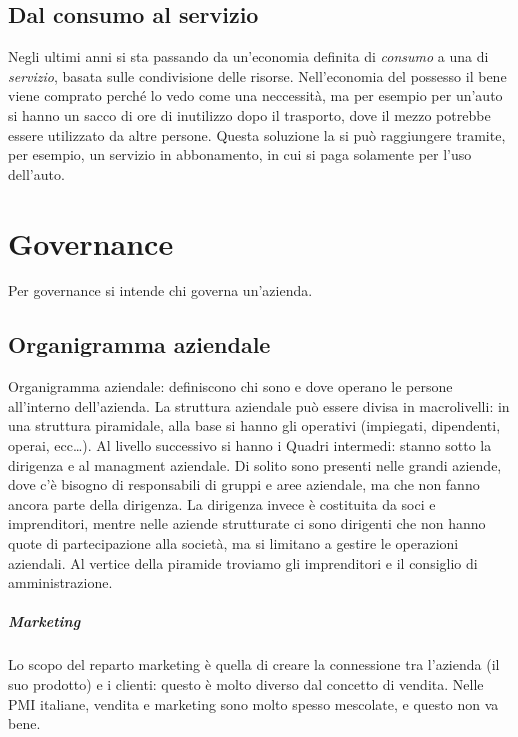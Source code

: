 \section{Dal consumo al servizio} 

Negli ultimi anni si sta passando da un'economia definita di \textit{consumo} a
una di \textit{servizio}, basata sulle condivisione delle risorse.
Nell'economia del possesso il bene viene comprato perché lo vedo come una
neccessità, ma per esempio per un'auto si hanno un sacco di ore di inutilizzo
dopo il trasporto, dove il mezzo potrebbe essere utilizzato da altre persone.
Questa soluzione la si può raggiungere tramite, per esempio, un servizio in
abbonamento, in cui si paga solamente per l'uso dell'auto.


\chapter{Governance}

Per governance si intende chi governa un'azienda.

\section{Organigramma aziendale}
Organigramma aziendale: definiscono chi sono e dove operano le persone
all'interno dell'azienda. La struttura aziendale può essere divisa in
macrolivelli: in una struttura piramidale, alla base si hanno gli operativi
(impiegati, dipendenti, operai, ecc\dots). Al livello successivo si hanno i
Quadri intermedi: stanno sotto la dirigenza e al managment aziendale. Di solito
sono presenti nelle grandi aziende, dove c'è bisogno di responsabili di gruppi
e aree aziendale, ma che non fanno ancora parte della dirigenza. La dirigenza
invece è costituita da soci e imprenditori, mentre nelle aziende strutturate ci
sono dirigenti che non hanno quote di partecipazione alla società, ma si
limitano a gestire le operazioni aziendali. Al vertice della piramide troviamo
gli imprenditori e il consiglio di amministrazione.

\paragraph*{Marketing} Lo scopo del reparto marketing è quella di creare la
connessione tra l'azienda (il suo prodotto) e i clienti: questo è molto diverso
dal concetto di vendita. Nelle PMI italiane, vendita e marketing sono
molto spesso mescolate, e questo non va bene.

